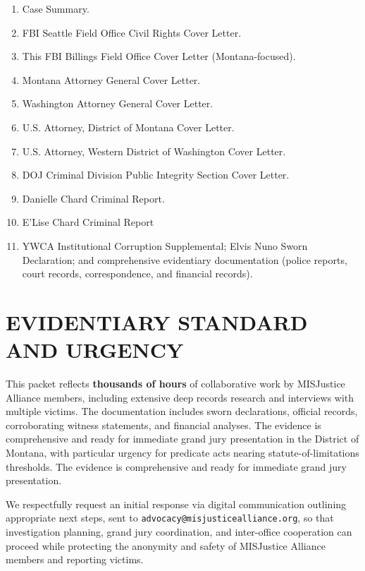 \documentclass[12pt,oneside]{article}
\begin{document}
\begin{flushleft}
\begin{enumerate}
\item Case Summary.
\item FBI Seattle Field Office Civil Rights Cover Letter.
\item This FBI Billings Field Office Cover Letter (Montana-focused).
\item Montana Attorney General Cover Letter.
\item Washington Attorney General Cover Letter.
\item U.S. Attorney, District of Montana Cover Letter.
\item U.S. Attorney, Western District of Washington Cover Letter.
\item DOJ Criminal Division Public Integrity Section Cover Letter.
\item Danielle Chard Criminal Report.
\item E'Lise Chard Criminal Report
\item YWCA Institutional Corruption Supplemental; Elvis Nuno Sworn Declaration; and comprehensive evidentiary documentation (police reports, court records, correspondence, and financial records).
\end{enumerate}

\section*{EVIDENTIARY STANDARD AND URGENCY}

This packet reflects \textbf{thousands of hours} of collaborative work by MISJustice Alliance members, including extensive deep records research and interviews with multiple victims. The documentation includes sworn declarations, official records, corroborating witness statements, and financial analyses. The evidence is comprehensive and ready for immediate grand jury presentation in the District of Montana, with particular urgency for predicate acts nearing statute-of-limitations thresholds. The evidence is comprehensive and ready for immediate grand jury presentation.

We respectfully request an initial response via digital communication outlining appropriate next steps, sent to \texttt{advocacy@misjusticealliance.org}, so that investigation planning, grand jury coordination, and inter-office cooperation can proceed while protecting the anonymity and safety of MISJustice Alliance members and reporting victims.

\vspace{0.3in}


\end{flushleft}
\end{document}
